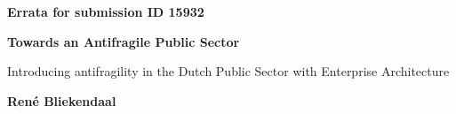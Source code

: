 \thispagestyle{plain}
\begin{center}
	\Large
	\textbf{Errata for submission ID 15932}

	\vspace{0.3cm}
	\textbf{Towards an Antifragile Public Sector}
	
	\vspace{0.3cm}
	\large
	Introducing antifragility in the Dutch Public Sector with Enterprise Architecture

	\vspace{0.3cm}
	\textbf{René Bliekendaal}
		
	\vspace{0.4cm}
\end{center}

